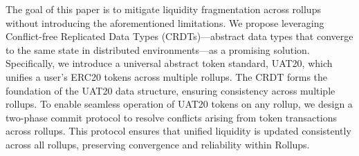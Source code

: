 The goal of this paper is to mitigate liquidity fragmentation across rollups without introducing the aforementioned limitations. We propose leveraging Conflict-free Replicated Data Types (CRDTs)—abstract data types that converge to the same state in distributed environments\cite{preguicca2018conflict,enes2019efficient}—as a promising solution. Specifically, we introduce a universal abstract token standard, UAT20, which unifies a user's ERC20 tokens across multiple rollups. The CRDT forms the foundation of the UAT20 data structure, ensuring consistency across multiple rollups. To enable seamless operation of UAT20 tokens on any rollup, we design a two-phase commit protocol to resolve conflicts arising from token transactions across rollups. This protocol ensures that 
unified liquidity is updated consistently across all rollups, preserving convergence and reliability within Rollups.





